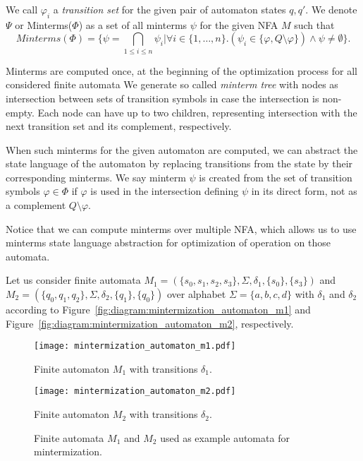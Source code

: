 We call $\varphi_i$ a \emph{transition  set} for the given pair of automaton states $q, q'$. We denote $\Psi$ or Minterms($\Phi$) as a set of all minterms $\psi$ for the given NFA $M$ such that
$$ Minterms(\Phi) = \biggr\{ \psi = \bigcap_{1 \leq i \leq n} \psi_i \biggr|
\forall i \in \{1, \dots, n\} . (\psi_i \in \{ \varphi, Q \setminus \varphi \}) \land \psi \neq \emptyset \biggr\} \text{.} $$

Minterms are computed once, at the beginning of the optimization process for all considered finite automata
We generate so called \emph{minterm tree} with nodes as intersection between sets of transition symbols in case the intersection is non-empty. Each node can have up to two children, representing intersection with the next transition set and its complement, respectively.

When such minterms for the given automaton are computed, we can abstract the state language of the automaton by replacing transitions from the state by their corresponding minterms. We say minterm $\psi$ is created from the set of transition symbols $\varphi \in \Phi$ if $\varphi$ is used in the intersection defining $\psi$ in its direct form, not as a complement $Q \setminus \varphi$.

Notice that we can compute minterms over multiple NFA, which allows us to use minterms state language abstraction for optimization of operation on those automata.

Let us consider finite automata $M_1 = (\{s_0, s_1, s_2, s_3\}, \Sigma, \delta_1, \{s_0\}, \{s_3\})$ and $M_2 = (\{q_0, q_1, q_2\}, \Sigma, \delta_2, \{q_1\}, \{q_0\})$ over alphabet $\Sigma = \{a, b, c, d\}$ with $\delta_1$ and $\delta_2$ according to Figure~\ref{fig:diagram:mintermization_automaton_m1} and Figure~\ref{fig:diagram:mintermization_automaton_m2}, respectively.

\begin{figure*}[ht]
    \centering
    \begin{minipage}{0.49\linewidth}
        \centering
        \texttt{[image: mintermization\_automaton\_m1.pdf]}
        \caption{Finite automaton $M_1$ with transitions $\delta_1$.}
        \label{fig:diagram:mintermization_automaton_m1}
    \end{minipage}
    \hfill
    \begin{minipage}{0.49\linewidth}
        \centering
        \texttt{[image: mintermization\_automaton\_m2.pdf]}
        \caption{Finite automaton $M_2$ with transitions $\delta_2$.}
        \label{fig:diagram:mintermization_automaton_m2}
    \end{minipage}
    \vspace{0.5cm}
    \caption{Finite automata $M_1$ and $M_2$ used as example automata for mintermization.}
    \label{fig:diagram:mintermization_automata}
\end{figure*}

